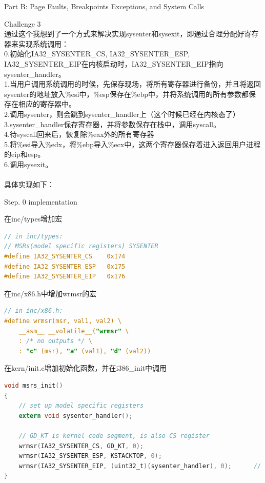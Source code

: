 \documentclass[GBK,winfonts,a4paper,10pt]{ctexart}
\begin{document}
\begin{section}{ Part B: Page Faults, Breakpoints Exceptions, and System Calls }
\begin{subsection}{ Challenge 3 }
~\\
通过这个我想到了一个方式来解决实现sysenter和sysexit，即通过合理分配好寄存器来实现系统调用：	\\
0.初始化IA32\_SYSENTER\_CS, IA32\_SYSENTER\_ESP, IA32\_SYSENTER\_EIP在内核启动时，IA32\_SYSENTER\_EIP指向sysenter\_handler。 \\
1.当用户调用系统调用的时候，先保存现场，将所有寄存器进行备份，并且将返回sysenter的地址放入\%esi中，\%esp保存在\%ebp中，并将系统调用的所有参数都保存在相应的寄存器中。\\
2.调用sysenter，则会跳到sysenter\_handler上（这个时候已经在内核态了）		\\
3.sysenter\_handler保存寄存器，并将参数保存在栈中，调用syscall。			\\
4.待syscall回来后，恢复除\%eax外的所有寄存器								\\
5.将\%esi导入\%edx，将\%ebp导入\%ecx中，这两个寄存器保存着进入返回用户进程的eip和esp。		\\
6.调用sysexit。	\\
~\\
具体实现如下：	
\begin{subsubsection}{ Step. 0 implementation }
\par
在inc/types增加宏	\par
\begin{lstlisting}[language=C]
// in inc/types:
// MSRs(model specific registers) SYSENTER
#define IA32_SYSENTER_CS	0x174
#define IA32_SYSENTER_ESP	0x175
#define IA32_SYSENTER_EIP	0x176
\end{lstlisting}

\par
在inc/x86.h中增加wrmsr的宏	\par
\begin{lstlisting}[language=C]
// in inc/x86.h:
#define wrmsr(msr, val1, val2) \
	__asm__ __volatile__("wrmsr" \
	: /* no outputs */ \
	: "c" (msr), "a" (val1), "d" (val2))
\end{lstlisting}

\par
在kern/init.c增加初始化函数，并在i386\_init中调用	\par
\begin{lstlisting}[language=C]
void msrs_init()
{
	// set up model specific registers
	extern void sysenter_handler();

	// GD_KT is kernel code segment, is also CS register
	wrmsr(IA32_SYSENTER_CS, GD_KT, 0);
	wrmsr(IA32_SYSENTER_ESP, KSTACKTOP, 0);
	wrmsr(IA32_SYSENTER_EIP, (uint32_t)(sysenter_handler), 0);		// entry of sysenter
}
\end{lstlisting}
\end{subsubsection}


\end{subsection}
\end{section}
\end{document}
